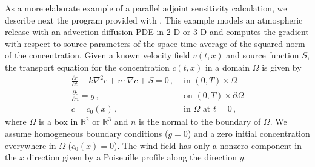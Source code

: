 As a more elaborate example of a parallel adjoint sensitivity calculation,
we describe next the program  provided
with {\cvodes}. This example models an atmospheric 
release with an advection-diffusion PDE in 2-D or 3-D and computes the gradient 
with respect to source parameters of the space-time average of the squared norm
of the concentration.
Given a known velocity field $v(t,x)$ and source function $S$, the  transport
equation for the concentration $c(t,x)$ in a domain $\Omega$ is given by
\begin{equation}\label{e:cvsAtmDisp_ASAi_kry_bbd_p_PDE}
  \begin{split}
    \frac{\partial c}{\partial t} - k \nabla^2 c + v \cdot \nabla c + S = 0 \, , 
    &\text{ in } (0,T) \times \Omega \\
    \frac{\partial c}{\partial n} = g \, ,
    &\text{ on } (0,T) \times \partial\Omega \\
    c = c_0(x) \, ,
    &\text{ in } \Omega \text{ at } t = 0 \, ,
  \end{split}
\end{equation}
where $\Omega$ is a box in ${\mathbb{R}}^2$ or ${\mathbb{R}}^3$ and $n$ is the 
normal to the boundary of $\Omega$.
We assume homogeneous boundary conditions ($g = 0$) and a zero initial
concentration everywhere in $\Omega$ ($c_0(x) = 0$). The wind field has only a
nonzero component in the $x$ direction given by a Poiseuille profile along the 
direction $y$.

